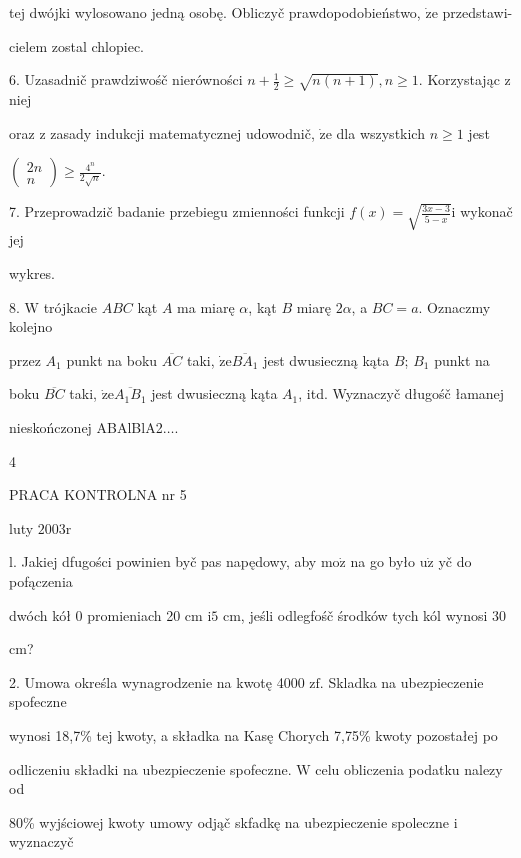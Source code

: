 \documentclass[a4paper,12pt]{article}
\begin{document}
tej dwójki wylosowano jedną osobę. Obliczyč prawdopodobieństwo, $\dot{\mathrm{z}}\mathrm{e}$ przedstawi-

cielem zostal chlopiec.

6. Uzasadnič prawdziwośč nierówności $n+\displaystyle \frac{1}{2}\geq\sqrt{n(n+1)}, n\geq 1$. Korzystając $\mathrm{z}$ niej

oraz $\mathrm{z}$ zasady indukcji matematycznej udowodnič, $\dot{\mathrm{z}}\mathrm{e}$ dla wszystkich $n\geq 1$ jest

$\displaystyle \left(\begin{array}{l}
2n\\
n
\end{array}\right)\geq\frac{4^{n}}{2\sqrt{n}}.$

7. Przeprowadzič badanie przebiegu zmienności funkcji $f(x) = \sqrt{\frac{3x-3}{5-x}}\mathrm{i}$ wykonač jej

wykres.

8. $\mathrm{W}$ trójkacie $ABC$ kąt $A$ ma miarę $\alpha$, kąt $B$ miarę $ 2\alpha$, a $BC=a$. Oznaczmy kolejno

przez $A_{1}$ punkt na boku $\overline{AC}$ taki, $\dot{\mathrm{z}}\mathrm{e}\overline{BA_{1}}$ jest dwusieczną kąta $B$; $B_{1}$ punkt na

boku $\overline{BC}$ taki, $\dot{\mathrm{z}}\mathrm{e}\overline{A_{1}B_{1}}$ jest dwusieczną kąta $A_{1}$, itd. Wyznaczyč długośč łamanej

nieskończonej ABAlBlA2$\ldots.$

4





PRACA KONTROLNA nr 5

luty $2003\mathrm{r}$

l. Jakiej dfugości powinien byč pas napędowy, aby $\mathrm{m}\mathrm{o}\dot{\mathrm{z}}$ na go było $\mathrm{u}\dot{\mathrm{z}}$ yč do pofączenia

dwóch kół $0$ promieniach 20 cm $\mathrm{i}5$ cm, jeśli odlegfośč środków tych kól wynosi 30

cm?

2. Umowa określa wynagrodzenie na kwotę 4000 $\mathrm{z}\mathrm{f}$. Skladka na ubezpieczenie spofeczne

wynosi 18,7\% tej kwoty, a składka na Kasę Chorych 7,75\% kwoty pozostałej po

odliczeniu składki na ubezpieczenie spofeczne. $\mathrm{W}$ celu obliczenia podatku nalezy od

80\% wyjściowej kwoty umowy odjąč skfadkę na ubezpieczenie spoleczne $\mathrm{i}$ wyznaczyč
\end{document}
